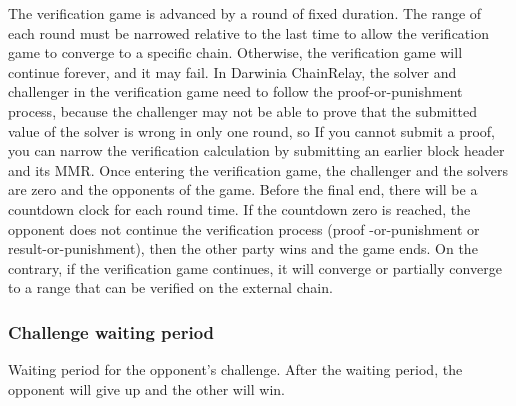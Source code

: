 The verification game is advanced by a round of fixed duration. The range of each round must be narrowed relative to the last time to allow the verification game to converge to a specific chain. Otherwise, the verification game will continue forever, and it may fail. In Darwinia ChainRelay, the solver and challenger in the verification game need to follow the proof-or-punishment process, because the challenger may not be able to prove that the submitted value of the solver is wrong in only one round, so If you cannot submit a proof, you can narrow the verification calculation by submitting an earlier block header and its MMR. Once entering the verification game, the challenger and the solvers are zero and the opponents of the game. Before the final end, there will be a countdown clock for each round time. If the countdown zero is reached, the opponent does not continue the verification process (proof -or-punishment or result-or-punishment), then the other party wins and the game ends. On the contrary, if the verification game continues, it will converge or partially converge to a range that can be verified on the external chain.


\subsubsection*{Challenge waiting period} Waiting period for the opponent's challenge. After the waiting period, the opponent will give up and the other will win.

